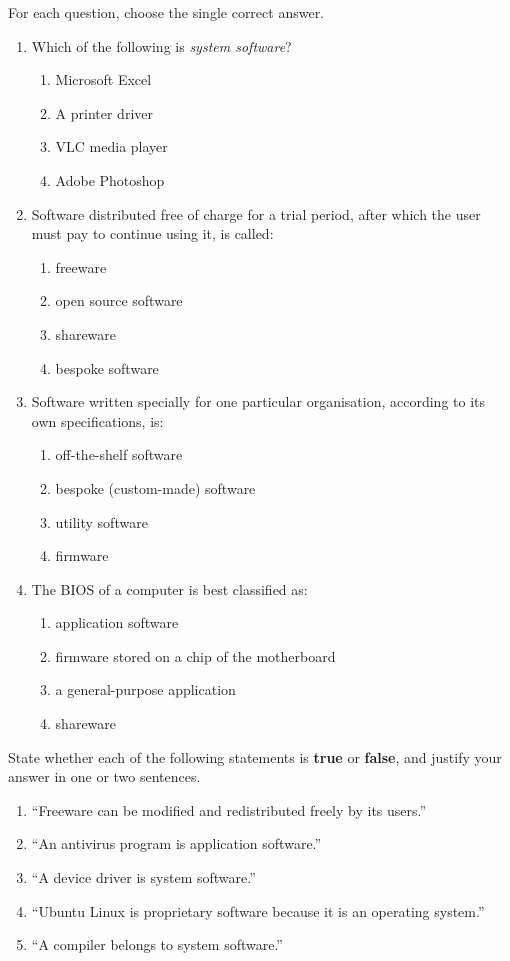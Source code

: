 \documentclass[11pt]{article}
\begin{document}
\begin{exercice}
For each question, choose the single correct answer.
\begin{enumerate}
\item Which of the following is \emph{system software}?
\begin{enumerate}
\item Microsoft Excel
\item A printer driver
\item VLC media player
\item Adobe Photoshop
\end{enumerate}
\item Software distributed free of charge for a trial period, after which the user must pay to continue using it, is called:
\begin{enumerate}
\item freeware
\item open source software
\item shareware
\item bespoke software
\end{enumerate}
\item Software written specially for one particular organisation, according to its own specifications, is:
\begin{enumerate}
\item off-the-shelf software
\item bespoke (custom-made) software
\item utility software
\item firmware
\end{enumerate}
\item The BIOS of a computer is best classified as:
\begin{enumerate}
\item application software
\item firmware stored on a chip of the motherboard
\item a general-purpose application
\item shareware
\end{enumerate}
\end{enumerate}
\end{exercice}

\begin{exercice}
State whether each of the following statements is \textbf{true} or \textbf{false}, and justify your answer in one or two sentences.
\begin{enumerate}
\item ``Freeware can be modified and redistributed freely by its users.''
\item ``An antivirus program is application software.''
\item ``A device driver is system software.''
\item ``Ubuntu Linux is proprietary software because it is an operating system.''
\item ``A compiler belongs to system software.''
\end{enumerate}
\end{exercice}
\end{document}
